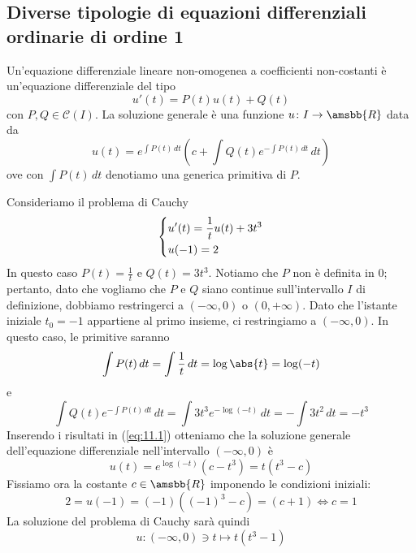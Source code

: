 \subsection{Diverse tipologie di equazioni differenziali ordinarie di ordine 1}
\begin{definition}
    \label{def:11.4}
    Un'equazione differenziale lineare non-omogenea a coefficienti non-costanti è un'equazione differenziale del tipo
    \[
    u'(t) = P(t)u(t) + Q(t)
    \]
    con $P, Q\in\mathscr{C}(I)$. La soluzione generale è una funzione $u\colon I \to \amsbb{R}$ data da
    \begin{equation}
        \label{eq:11.1}
        u(t) = e^{\int P(t)\, dt}\left(c+\int Q(t) e^{-\int P(t)\, dt}\, dt\right)
    \end{equation}
    ove con $\int P(t)\, dt$ denotiamo una generica primitiva di $P$.
\end{definition}
\begin{example}
    Consideriamo il problema di Cauchy
    \[
    \begin{dcases}
        u'(t) = \frac{1}{t}u(t) + 3t^3\\
        u(-1) = 2
    \end{dcases}
    \]
    In questo caso $P(t) = \frac{1}{t}$ e $Q(t) = 3t^3$. Notiamo che $P$ non è definita in $0$; pertanto, dato che vogliamo che $P$ e $Q$ siano continue sull'intervallo $I$ di definizione, dobbiamo restringerci a $(-\infty, 0)$ o $(0, +\infty)$. Dato che l'istante iniziale $t_0=-1$ appartiene al primo insieme, ci restringiamo a $(-\infty, 0)$. In questo caso, le primitive saranno
    \[
    \int P(t)\, dt = \int \frac{1}{t}\, dt = \log\abs{t} = \log(-t)
    \]
    e
    \[
    \int Q(t) e^{-\int P(t)\, dt}\, dt = \int 3t^3 e^{-\log(-t)}\, dt = -\int 3t^2\, dt = -t^3
    \]
    Inserendo i risultati in (\ref{eq:11.1}) otteniamo che la soluzione generale dell'equazione differenziale nell'intervallo $(-\infty, 0)$ è 
    \[
    u(t) = e^{\log(-t)}(c-t^3) = t(t^3-c)
    \]
    Fissiamo ora la costante $c\in\amsbb{R}$ imponendo le condizioni iniziali:
    \[
    2 = u(-1) = (-1)((-1)^3-c) = (c+1) \iff c = 1
    \]
    La soluzione del problema di Cauchy sarà quindi
    \[
    u\colon (-\infty, 0)\ni t \mapsto t(t^3-1)
    \]
\end{example}
